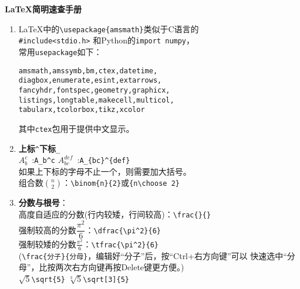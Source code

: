 \documentclass{article}
\newcommand{\q}{\quad}
\begin{document}
\begin{center}
{\Large \textbf{\LaTeX 简明速查手册} }
\end{center}  


\begin{multicols}{2}     
\begin{enumerate}

\item \LaTeX 中的\verb|\usepackage{amsmath}|类似于C语言的\\ \verb|#include<stdio.h>|
和Python的\verb|import numpy|，\\ 常用\verb|usepackage|如下：
\begin{lstlisting}
amsmath,amssymb,bm,ctex,datetime, 
diagbox,enumerate,esint,extarrows,
fancyhdr,fontspec,geometry,graphicx,
listings,longtable,makecell,multicol,
tabularx,tcolorbox,tikz,xcolor  
\end{lstlisting} 
其中\verb|ctex|包用于提供中文显示。

\item \textbf{上标}\q \verb|^|\quad \textbf{下标}\q \verb|_| \\
$ A_b^c $\ :\q \verb|A_b^c| \q\q\q\q 
$ A_{bc}^{def} $\ :\q \verb|A_{bc}^{def}| \\
如果上下标的字母不止一个，则需要加大括号。\\
组合数$ \binom{n}{2} $：\verb|\binom{n}{2}|或\verb|{n\choose 2}|

\item \textbf{分数与根号}：\\
高度自适应的分数(行内较矮，行间较高)：\verb|\frac{}{}|\\
强制较高的分数$ \dfrac{\pi^2}{6} $：\verb|\dfrac{\pi^2}{6}| \\
强制较矮的分数$ \tfrac{\pi^2}{6} $：\verb|\tfrac{\pi^2}{6}| \\
(\verb|\frac{分子}{分母}|，编辑好“分子”后，按“Ctrl+右方向键”可以
快速选中“分母”，比按两次右方向键再按Delete键更方便。)\\
$ \sqrt{5} $\q \verb|\sqrt{5}| \q\q\q\q 
$ \sqrt[3]{5} $\q \verb|\sqrt[3]{5}| 


\end{enumerate}
\end{multicols}
\end{document}
